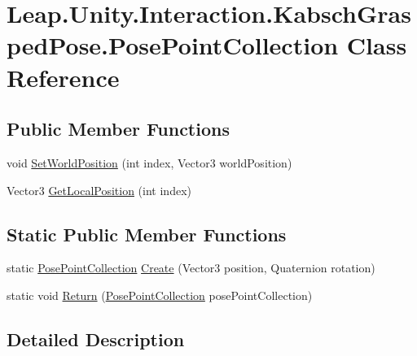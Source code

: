 \hypertarget{class_leap_1_1_unity_1_1_interaction_1_1_kabsch_grasped_pose_1_1_pose_point_collection}{}\section{Leap.\+Unity.\+Interaction.\+Kabsch\+Grasped\+Pose.\+Pose\+Point\+Collection Class Reference}
\label{class_leap_1_1_unity_1_1_interaction_1_1_kabsch_grasped_pose_1_1_pose_point_collection}
\subsection*{Public Member Functions}
\begin{DoxyCompactItemize}
\item 
void \mbox{\hyperlink{class_leap_1_1_unity_1_1_interaction_1_1_kabsch_grasped_pose_1_1_pose_point_collection_ae80589ef2b221a47b00900147289b99a}{Set\+World\+Position}} (int index, Vector3 world\+Position)
\item 
Vector3 \mbox{\hyperlink{class_leap_1_1_unity_1_1_interaction_1_1_kabsch_grasped_pose_1_1_pose_point_collection_aa9c5134fa34730ce67e8a46fba8bd160}{Get\+Local\+Position}} (int index)
\end{DoxyCompactItemize}
\subsection*{Static Public Member Functions}
\begin{DoxyCompactItemize}
\item 
static \mbox{\hyperlink{class_leap_1_1_unity_1_1_interaction_1_1_kabsch_grasped_pose_1_1_pose_point_collection}{Pose\+Point\+Collection}} \mbox{\hyperlink{class_leap_1_1_unity_1_1_interaction_1_1_kabsch_grasped_pose_1_1_pose_point_collection_a1baf5ec370452ba0450304d53c6100d6}{Create}} (Vector3 position, Quaternion rotation)
\item 
static void \mbox{\hyperlink{class_leap_1_1_unity_1_1_interaction_1_1_kabsch_grasped_pose_1_1_pose_point_collection_ae6915d095bb56555964c6ea063ab18d4}{Return}} (\mbox{\hyperlink{class_leap_1_1_unity_1_1_interaction_1_1_kabsch_grasped_pose_1_1_pose_point_collection}{Pose\+Point\+Collection}} pose\+Point\+Collection)
\end{DoxyCompactItemize}


\subsection{Detailed Description}


